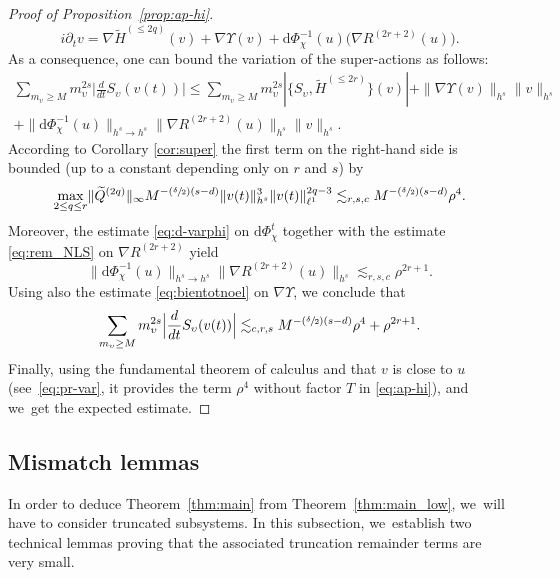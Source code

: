 \documentclass[10pt,a4paper]{amsart}
\newcommand{\Psfrac}[2]{(\sfrac{#1}{#2})}
\theoremstyle{plain}
\theoremstyle{definition}
\newcommand{\1}{\mathbf{1}}
\begin{document}
\begin{proof}[Proof of Proposition~\ref{prop:ap-hi}]
\[
i\partial_{t}v = \nabla \widetilde{H}^{(\leq 2q)}(v) + \nabla \Upsilon (v) + \mathrm{d}\Phi_\chi^{-1}(u)\bigl(\nabla R^{(2r+2)}(u)\bigr).
\]
As a consequence, one can bound the variation of the super-actions as follows:
\begin{multline}
\label{eq:pr-v}
\sum_{m_\upsilon \geq M}m_\upsilon^{2s}\Big|\frac{d}{dt}S_{\upsilon}(v(t))\Big|
\leq \sum_{m_\upsilon \geq M}m_\upsilon^{2s}|\{S_{\upsilon},\widetilde{H}^{(\leq 2r)}\}(v)|
+ \|\nabla \Upsilon (v)\|_{h^{s}}\|v\|_{h^{s}}\\+\|\mathrm{d}\Phi_\chi^{-1}(u)\|_{h^{s}\to h^{s}}\|\nabla R^{(2r+2)}(u)\|_{h^{s}}\|v\|_{h^{s}}.
\end{multline}
According to Corollary \ref{cor:super} the first term on the right-hand side is bounded (up to a constant depending only on $r$ and $s$) by
\[
\underset{2\leq q \leq r}{\max} \|\widetilde{Q}^{(2q)}\|_{\infty} M^{-\Psfrac{\delta}{2}(s-d)}\|v(t)\|_{h^{s}}^{3} \|v(t)\|_{\ell^{1}}^{2q-3} \lesssim_{r,s,c} M^{-\Psfrac{\delta}{2}(s-d)} \rho^4.
\]
Moreover, the estimate \eqref{eq:d-varphi} on $\mathrm{d}\Phi_\chi^{t}$ together with the estimate \eqref{eq:rem_NLS} on $\nabla R^{(2r+2)}$ yield
\[
\|\mathrm{d}\Phi_\chi^{-1}(u)\|_{h^{s}\to h^{s}}\| \nabla R^{(2r+2)} (u)\|_{h^{s}} \lesssim_{r,s,c} \rho^{2r+1}.
\]
Using also the estimate \eqref{eq:bientotnoel} on $\nabla \Upsilon$,
we conclude that
\[
\sum_{m_\upsilon \geq M}m_\upsilon^{2s}\Big|\frac{d}{dt}S_{\upsilon}(v(t))\Big| \lesssim_{c,r,s} M^{-\Psfrac{\delta}{2}(s-d)} \rho^4+ \rho^{2r+1}.
\]
Finally, using the fundamental theorem of calculus and that $v$ is close to $u$ (see~\eqref{eq:pr-var}, it provides the term $\rho^4$ without factor $T$ in \eqref{eq:ap-hi}), and we~get the expected estimate.
\end{proof}

\subsection{Mismatch lemmas} In order to deduce Theorem~\ref{thm:main} from Theorem~\ref{thm:main_low}, we~will have to consider truncated subsystems. In this subsection, we~establish two technical lemmas proving that the associated truncation remainder terms are very small.
\end{document}
